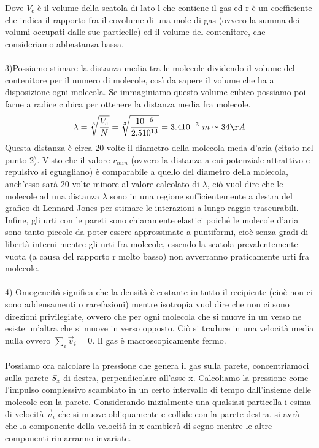 \documentclass[10pt,a4paper]{article}
\begin{document}
Dove $V_c$ è il volume della scatola di lato l che contiene il gas ed r è un coefficiente che indica il rapporto fra il covolume di una mole di gas (ovvero la summa dei volumi occupati dalle sue particelle) ed il volume del contenitore, che consideriamo abbastanza bassa. \\\\
3)Possiamo stimare la distanza media tra le molecole dividendo il volume del contenitore per il numero di molecole, così da sapere il volume che ha a disposizione ogni molecola. Se immaginiamo questo volume cubico possiamo poi farne a radice cubica per ottenere la distanza media fra molecole.
\begin{align*}
	\lambda = \sqrt[3]{\frac{V_c}{N}} = \sqrt[3]{\frac{10^{-6}}{2.5 10^{13}}}= 3.4 10^{-3}\ m \simeq 34\AA
\end{align*}
Questa distanza è circa 20 volte il diametro della molecola meda d'aria (citato nel punto 2). Visto che il valore $r_{min}$ (ovvero la distanza a cui potenziale attrattivo e repulsivo si eguagliano) è comparabile a quello del diametro della molecola, anch'esso sarà 20 volte minore al valore calcolato di $\lambda$, ciò vuol dire che le molecole ad una distanza $\lambda$ sono in una regione sufficientemente a destra del grafico di Lennard-Jones per stimare le interazioni a lungo raggio trascurabili. Infine, gli urti con le pareti sono chiaramente elastici poiché le molecole d'aria sono tanto piccole da poter essere approssimate a puntiformi, cioè senza gradi di libertà interni mentre gli urti fra molecole, essendo la scatola prevalentemente vuota (a causa del rapporto r molto basso) non avverranno praticamente urti fra molecole.\\\\
4) Omogeneità significa che la densità è costante in tutto il recipiente (cioè non ci sono addensamenti o rarefazioni) mentre isotropia vuol dire che non ci sono direzioni privilegiate, ovvero che per ogni molecola che si muove in un verso ne esiste un'altra che si muove in verso opposto. Ciò si traduce in una velocità media nulla ovvero $\sum_i \vec{v}_i = 0$. Il gas è macroscopicamente fermo.\\\\
Possiamo ora calcolare la pressione che genera il gas sulla parete, concentriamoci sulla parete $S_x$ di destra, perpendicolare all'asse x. Calcoliamo la pressione come l'impulso complessivo scambiato in un certo intervallo di tempo dall'insieme delle molecole con la parete. Considerando inizialmente una qualsiasi particella i-esima di velocità $\vec{v}_i$ che si muove obliquamente e collide con la parete destra, si avrà che la componente della velocità in x cambierà di segno mentre le altre componenti rimarranno invariate.
\end{document}
